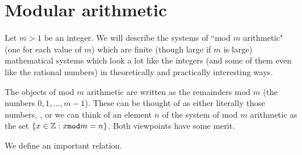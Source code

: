 \documentclass[12pt]{article}
\begin{document}
\section{Modular arithmetic}

Let $m>1$ be an integer.  We will describe the systems of ``mod $m$ arithmetic" (one for each value of $m$) which are finite (though large if $m$ is large) mathematical systems which look a lot like the integers (and some of them even like the rational numbers) in theoretically and practically interesting ways.

The objects of mod $m$ arithmetic are written as the remainders mod $m$ (the numbers $0,1,\ldots,m-1$).  These can be thought of as either literally those numbers, , or we can think of an element $n$ of the system of mod $m$ arithmetic as the set $\{x \in \mathbb Z:x {\tt mod}m = n\}$.  Both viewpoints have some merit.

We define an important relation.
\end{document}
